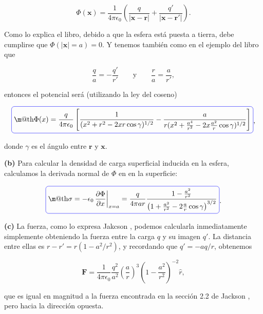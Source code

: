 \documentclass[a4paper,10pt]{article}
\makeatletter
\numberwithin{equation}{section}
\newcommand{\zerodel}{.\kern-\nulldelimiterspace}
\newcommand*{\boxcolor}{blue}
\renewcommand{\boxed}[1]{\textcolor{\boxcolor}{%
\tikz[baseline={([yshift=-1ex]current bounding box.center)}] \node [rectangle, minimum width=1ex,rounded corners,draw] {\normalcolor\m@th$\displaystyle#1$};}}
\makeatother
\begin{document}
\begin{equation}
 \Phi(\mathbf{x}) = \frac{1}{4\pi\epsilon_0}\left(\frac{q}{|\mathbf{x}-\mathbf{r}|} + 
 \frac{q'}{|\mathbf{x}-\mathbf{r}'|} \right).
\end{equation}

Como lo explica el libro, debido a que la esfera está puesta a tierra, debe cumplirse 
que $\Phi(|\mathbf{x}| = a) = 0$. Y tenemos también como en el ejemplo del libro 
que 

\begin{equation}
 \frac{q}{a} = - \frac{q'}{r'} \qquad \text{y} \qquad \frac{r}{a} = \frac{a}{r'},
\end{equation}

entonces el potencial será (utilizando la ley del coseno)

\begin{equation}
 \boxed{\Phi(x) = \frac{q}{4\pi\epsilon_0}\left[\frac{1}{(x^2+r^2-2xr\cos{\gamma})^{1/2}}
 - \frac{a}{r(x^2+\frac{a^4}{r^2}-2x\frac{a^2}{r}\cos{\gamma})^{1/2}}\right]},
\end{equation}

donde $\gamma$ es el ángulo entre $\mathbf{r}$ y $\mathbf{x}$.

\vspace{.3cm}

\textbf{(b)} Para calcular la densidad de carga superficial inducida en la esfera, 
calculamos la derivada normal de $\Phi$ en en la superficie:

\begin{equation}
 \boxed{\sigma = -\epsilon_0\left\zerodel\frac{\partial \Phi}{\partial x}\right|_{x=a} = 
 \frac{q}{4\pi a r}\frac{1 - \frac{a^2}{r^2}}{\left(1 + \frac{a^2}{r^2} - 
 2\frac{a}{r}\cos{\gamma}\right)^{3/2}}}.
\end{equation}

\textbf{(c)} La fuerza, como lo expresa Jakcson \cite{jackson3}, podemos calcularla 
inmediatamente simplemente obteniendo la fuerza entre la carga $q$ y su imagen 
$q'$. La distancia entre ellas es $r - r' = r(1 - a^2/r^2)$, y recordando que 
$q' = - aq/r$, obtenemos 

\begin{equation}
 \mathbf{F} = \frac{1}{4\pi\epsilon_0}\frac{q^2}{a^2}\left(\frac{a}{r}\right)^3 
 \left(1 - \frac{a^2}{r^2} \right)^{-2} \hat{r},
\end{equation}

que es igual en magnitud a la fuerza encontrada en la sección 2.2 de Jackson \cite{jackson3},
pero hacia la dirección opuesta.
\end{document}
